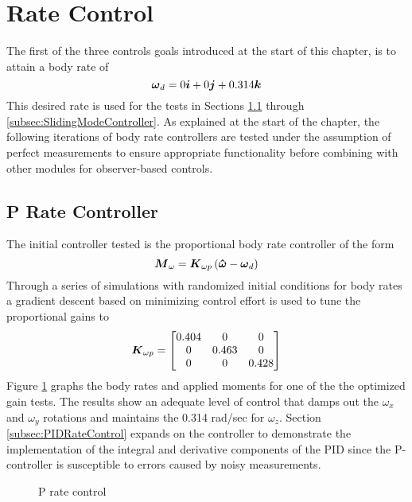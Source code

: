 \section{Rate Control}
\label{sec:RateControl}

The first of the three controls goals introduced at the start of this chapter, is to attain a body rate of
\begin{equation}
  \boldsymbol{\omega}_d = 0 \boldsymbol{i} + 0 \boldsymbol{j} + 0.314 \boldsymbol{k}
\end{equation}
This desired rate is used for the tests in Sections \ref{subsec:PRateControl} through \ref{subsec:SlidingModeController}.  As explained at the start of the chapter, the following iterations of body rate controllers are tested under the assumption of perfect measurements to ensure appropriate functionality before combining with other modules for observer-based controls.
\subsection{P Rate Controller}
\label{subsec:PRateControl}
The initial controller tested is the proportional body rate controller of the form
\begin{equation}
  \boldsymbol{M}_{\omega} = \boldsymbol{K}_{\omega p} \left( \boldsymbol{\hat{\omega}} - \boldsymbol{\omega}_d \right)
  \label{eqn:PRateControl}
\end{equation}
Through a series of simulations with randomized initial conditions for body rates a gradient descent based on minimizing control effort is used to tune the proportional gains to
\begin{equation}
  \boldsymbol{K}_{\omega p} = \begin{bmatrix} 0.404 & 0 & 0 \\ 0 & 0.463 & 0 \\ 0 & 0 & 0.428 \end{bmatrix}
\end{equation}
Figure \ref{fig:PRateControl} graphs the body rates and applied moments for one of the the optimized gain tests.  The results show an adequate level of control that damps out the $\omega_x$ and $\omega_y$ rotations and maintains the 0.314 rad/sec for $\omega_z$.  Section \ref{subsec:PIDRateControl} expands on the controller to demonstrate the implementation of the integral and derivative components of the PID since the P-controller is susceptible to errors caused by noisy measurements.
\begin{figure}[H]
  \centerline{}
  \caption{P rate control}
  \label{fig:PRateControl}
\end{figure}

